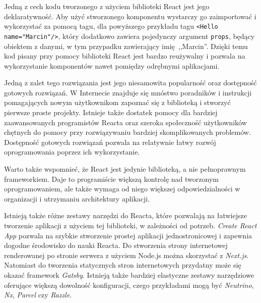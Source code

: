 \documentclass[twoside,a4paper]{report}
\begin{document}
Jedną z cech kodu tworzonego z użyciem biblioteki React jest jego deklaratywność.
Aby użyć stworzonego komponentu wystarczy go zaimportować i wykorzystać za pomocą tagu, dla powyższego przykładu tagu \texttt{<Hello name="Marcin"/>}, który dodatkowo zawiera pojedynczy argument \texttt{props}, będący obiektem z danymi, w tym przypadku zawierający imię~,,Marcin''.
Dzięki temu kod pisany przy pomocy biblioteki React jest bardzo reużywalny i pozwala na wykorzystanie komponentów nawet pomiędzy odrębnymi aplikacjami.

Jedną z zalet tego rozwiązania jest jego niesamowita popularność oraz dostępność gotowych rozwiązań.
W Internecie znajduje się mnóstwo poradników i instrukcji pomagających nowym użytkownikom zapoznać się z biblioteką i stworzyć pierwsze proste projekty.
Istnieje także dostatek pomocy dla bardziej zaawansowanych programistów Reacta oraz szeroka społeczność użytkowników chętnych do pomocy przy rozwiązywaniu bardziej skomplikowanych problemów.
Dostępność gotowych rozwiązań pozwala na relatywnie łatwy rozwój oprogramowania poprzez ich wykorzystanie.

Warto także wspomnieć, że React jest jedynie biblioteką, a nie pełnoprawnym frameworkiem.
Daje to programiście większą kontrolę nad tworzonym oprogramowaniem, ale także wymaga od niego większej odpowiedzialności w organizacji i utrzymaniu architektury aplikacji.

Istnieją także różne zestawy narzędzi do Reacta, które pozwalają na łatwiejsze tworzenie aplikacji z użyciem tej biblioteki, w zależności od potrzeb.
\textit{Create React App} pozwala na szybkie stworzenie prostej aplikacji jednostronicowej i zapewnia dogodne środowisko do nauki Reacta.
Do stworzenia strony internetowej renderowanej po stronie serwera z użyciem Node.js można skorzystać z \textit{Next.js}.
Natomiast do tworzenia statycznych stron internetowych przydatny może się okazać framework \textit{Gatsby}.
Istnieją także bardziej elastyczne zestawy narzędziowe oferujące większą dowolność konfiguracji, czego przykładami mogą być \textit{Neutrino}, \textit{Nx}, \textit{Parcel} czy \textit{Razzle}.
\end{document}
